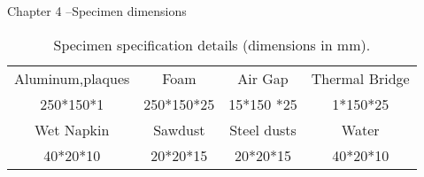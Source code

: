 \begin{frame}{Chapter 4 --\small{Specimen dimensions}}
    \begin{table}
    \centering

    \caption{Specimen specification details (dimensions in mm).}
    \hspace*{-20pt}
    \small
    \begin{tabular}{c|c|c|c}
        \hline
         Aluminum,plaques & Foam       & Air Gap     & Thermal Bridge \\
         250*150*1        & 250*150*25 & 15*150 *25  & 1*150*25       \\ 
         \hline
         Wet Napkin       & Sawdust    & Steel dusts & Water          \\ 
         40*20*10         & 20*20*15   & 20*20*15    & 40*20*10       \\ 
         \hline
    \end{tabular}
    \end{table}
\end{frame}





